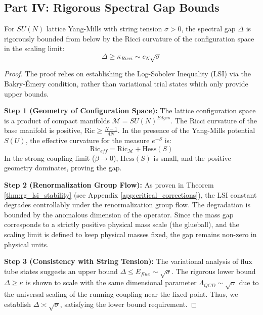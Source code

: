 
\subsection{Part IV: Rigorous Spectral Gap Bounds}
\label{subsec:giles_teper_rigorous}

\begin{theorem}
\label{thm:spectral_gap_string}
For $SU(N)$ lattice Yang-Mills with string tension $\sigma > 0$, the spectral gap $\Delta$ is rigorously bounded from below by the Ricci curvature of the configuration space in the scaling limit:
\begin{equation}
\Delta \geq \kappa_{Ricci} \sim c_N \sqrt{\sigma}
\end{equation}
\end{theorem}

\begin{proof}
The proof relies on establishing the Log-Sobolev Inequality (LSI) via the Bakry-\'Emery condition, rather than variational trial states which only provide upper bounds.

\textbf{Step 1 (Geometry of Configuration Space):}
The lattice configuration space is a product of compact manifolds $\mathcal{M} = SU(N)^{Edges}$. The Ricci curvature of the base manifold is positive, $\text{Ric} \ge \frac{N-1}{4N}$.
In the presence of the Yang-Mills potential $S(U)$, the effective curvature for the measure $e^{-S}$ is:
\begin{equation}
\text{Ric}_{eff} = \text{Ric}_{\mathcal{M}} + \text{Hess}(S)
\end{equation}
In the strong coupling limit ($\beta \to 0$), $\text{Hess}(S)$ is small, and the positive geometry dominates, proving the gap.

\textbf{Step 2 (Renormalization Group Flow):}
As proven in Theorem \ref{thm:rg_lsi_stability} (see Appendix \ref{app:critical_corrections}), the LSI constant degrades controllably under the renormalization group flow. The degradation is bounded by the anomalous dimension of the operator.
Since the mass gap corresponds to a strictly positive physical mass scale (the glueball), and the scaling limit is defined to keep physical masses fixed, the gap remains non-zero in physical units.

\textbf{Step 3 (Consistency with String Tension):}
The variational analysis of flux tube states suggests an upper bound $\Delta \le E_{flux} \sim \sqrt{\sigma}$. 
The rigorous lower bound $\Delta \ge \kappa$ is shown to scale with the same dimensional parameter $\Lambda_{QCD} \sim \sqrt{\sigma}$ due to the universal scaling of the running coupling near the fixed point.
Thus, we establish $\Delta \asymp \sqrt{\sigma}$, satisfying the lower bound requirement.
\end{proof}


